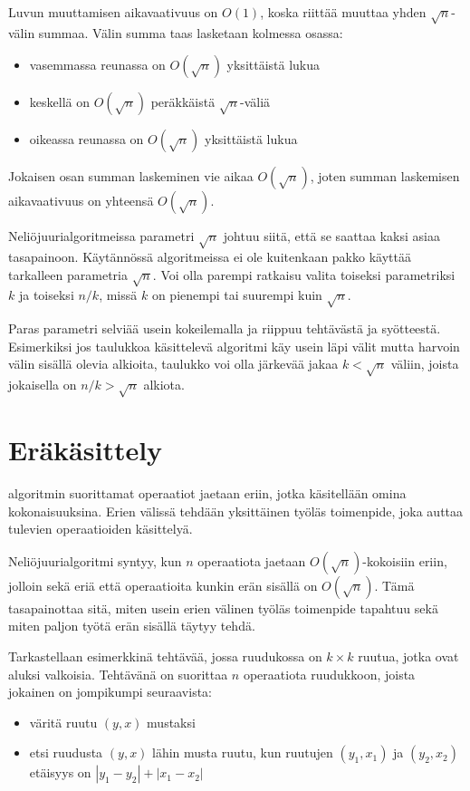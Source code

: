 Luvun muuttamisen aikavaativuus on
$O(1)$, koska riittää muuttaa yhden $\sqrt n$-välin summaa.
Välin summa taas lasketaan kolmessa osassa:

\begin{itemize}
\item vasemmassa reunassa on $O(\sqrt n)$ yksittäistä lukua
\item keskellä on $O(\sqrt n)$ peräkkäistä $\sqrt n$-väliä
\item oikeassa reunassa on $O(\sqrt n)$ yksittäistä lukua
\end{itemize}

Jokaisen osan summan laskeminen vie aikaa $O(\sqrt n)$,
joten summan laskemisen aikavaativuus on yhteensä $O(\sqrt n)$.

Neliöjuurialgoritmeissa parametri $\sqrt n$
johtuu siitä, että se saattaa kaksi asiaa tasapainoon.
Käytännössä algoritmeissa
ei ole kuitenkaan pakko käyttää
tarkalleen parametria $\sqrt n$.
Voi olla parempi ratkaisu valita toiseksi
parametriksi $k$ ja toiseksi $n/k$,
missä $k$ on pienempi tai suurempi kuin $\sqrt n$.

Paras parametri selviää usein kokeilemalla
ja riippuu tehtävästä ja syötteestä.
Esimerkiksi jos taulukkoa käsittelevä algoritmi
käy usein läpi välit mutta harvoin välin sisällä
olevia alkioita, taulukko voi olla järkevää
jakaa $k < \sqrt n$ väliin,
joista jokaisella on $n/k > \sqrt n$ alkiota.

\section{Eräkäsittely}


 algoritmin suorittamat
operaatiot jaetaan eriin,
jotka käsitellään omina kokonaisuuksina.
Erien välissä tehdään yksittäinen työläs toimenpide,
joka auttaa tulevien operaatioiden käsittelyä.

Neliöjuurialgoritmi syntyy, kun $n$ operaatiota
jaetaan $O(\sqrt n)$-kokoisiin eriin,
jolloin sekä eriä että operaatioita kunkin erän
sisällä on $O(\sqrt n)$.
Tämä tasapainottaa sitä, miten usein erien välinen
työläs toimenpide tapahtuu sekä miten paljon työtä
erän sisällä täytyy tehdä.

Tarkastellaan esimerkkinä tehtävää, jossa
ruudukossa on $k \times k$ ruutua,
jotka ovat aluksi valkoisia.
Tehtävänä on suorittaa $n$ operaatiota ruudukkoon,
joista jokainen on jompikumpi seuraavista:
\begin{itemize}
\item
väritä ruutu $(y,x)$ mustaksi
\item
etsi ruudusta $(y,x)$ lähin
musta ruutu, kun
ruutujen $(y_1,x_1)$ ja $(y_2,x_2)$
etäisyys on $|y_1-y_2|+|x_1-x_2|$
\end{itemize}

